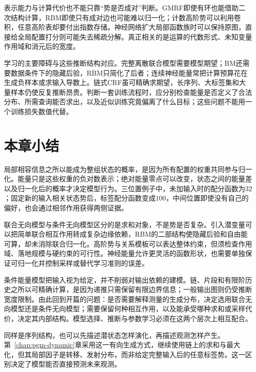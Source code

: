 表示能力与计算代价也不能只靠“势是否成对”判断。GMRF即使有环也能借助二次结构计算，RBM即使只有成对边也可能难以归一化；计数高阶势可以利用卷积，任意高阶表却要付出指数存储。神经网络扩大局部函数族时可以保持原图，直接给全局配置打分则可能失去稀疏分解。真正相关的是运算的代数形式、未知变量作用域和消元后的宽度。

学习的主要障碍与这些推断结构对应。完整离散联合模型需要模型期望；BM还需要数据条件下的隐藏后验，RBM只简化了后者；连续神经能量常把计算预算花在生成负样本或求输入导数上。链式CRF虽可精确求期望，长序列、大标签集和大量样本仍使反复推断昂贵。判断一套训练流程时，应分别检查能量是否定义了合法分布、所需查询能否求出，以及近似训练究竟偏离了什么目标；这些问题不能用一个训练损失数值代替。

\section{本章小结}
\label{sec:pgm-energy-models-summary}

局部相容信息之所以能成为整组状态的概率，是因为所有配置的权重共同参与归一化。能量只是这些权重的负对数表示；绝对能量零点可以改变，状态之间的能量差以及归一化后的概率才决定模型行为。三位置例子中，未加输入时的配分函数为$32$；固定新的输入相关状态势后，标签配分函数变成$100$，中间位置即使没有自己的偏好，也会通过相邻作用获得两侧证据。

联合无向模型与条件无向模型区分的是求和对象，不是势是否复杂。引入潜变量可以把简单联合相互作用转成复杂边缘依赖，RBM的二部结构使隐藏后验和自由能可算，却未消除联合归一化。高阶势与关系模板可以表达整体约束，但须检查作用域、落地规模与硬约束的可行性。神经能量允许更灵活的函数形状，也需要单独保证可归一化并控制采样或替代学习准则的误差。

条件能量模型把输入视为给定，并不削弱对输出依赖的建模。链、片段和有限阶历史之所以可精确计算，是因为递推只需保留有限边界信息；一般输出图则仍受推断宽度限制。由此回到开篇的问题：是否需要解释测量的生成分布，决定选用联合无向模型还是条件无向模型；需要保留何种相互作用，以及能承受哪种求和或采样代价，决定其内部结构。模型选择、推断与参数学习必须在这两个层次上相互配合。

同样是序列结构，也可以先描述潜状态怎样演化，再描述观测怎样产生。第~\ref{chap:pgm-dynamic}章采用这一有向生成方式，继续使用链上的求和与最大化，但其局部因子是转移、发射分布，而非给定完整输入后的任意标签势。这一区别决定了模型能否直接预测未来观测。
